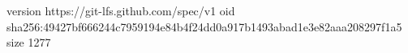 version https://git-lfs.github.com/spec/v1
oid sha256:49427bf666244c7959194e84b4f24dd0a917b1493abad1e3e82aaa208297f1a5
size 1277
